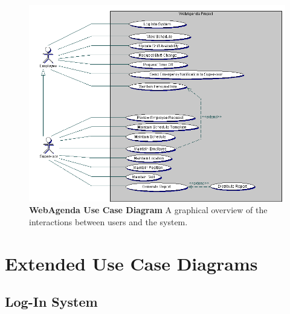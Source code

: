 \documentclass[letterpaper,12pt]{report}
\begin{document}
\begin{figure}[htp]
 \includegraphics[scale=0.8]{externals/UseCaseDiagram.png}
 \caption{\small
\textbf{WebAgenda Use Case Diagram }\newline A graphical overview of the interactions between users and the system.}\label{fig:usecase}

\end{figure}


\chapter{Extended Use Case Diagrams}
\newcommand{\xuchead}{
		\begin{tabular}{| p{8.5cm} | p{8.5cm} |}
		\hline 
			\cellcolor[gray]{0.8}\textbf{Actor}\index{actor} &\cellcolor[gray]{0.8} \textbf{System}\index{system} \\ 
		\hline
		\end{tabular}
		\newline
		\newline
}

\section{Log-In System}
\end{document}
